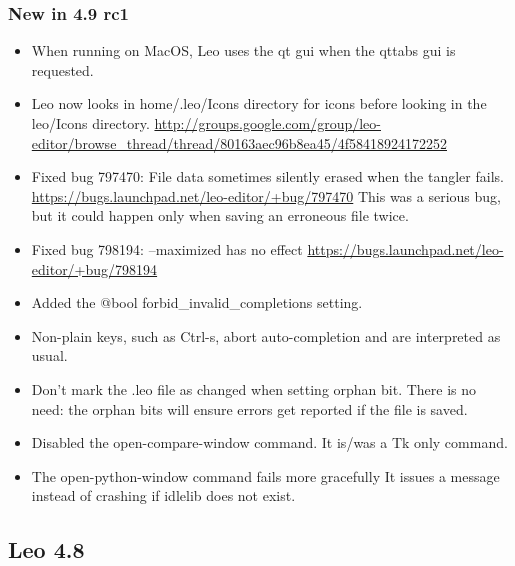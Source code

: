\documentclass[a4paper,10pt,english]{sphinxmanual}
\begin{document}
\subsubsection{New in 4.9 rc1}
\label{what-is-new:new-in-4-9-rc1}\begin{itemize}
\item {} 
When running on MacOS, Leo uses the qt gui when the qttabs gui is requested.

\item {} 
Leo now looks in home/.leo/Icons directory for icons before looking in the
leo/Icons directory.
\href{http://groups.google.com/group/leo-editor/browse\_thread/thread/80163aec96b8ea45/4f58418924172252}{http://groups.google.com/group/leo-editor/browse\_thread/thread/80163aec96b8ea45/4f58418924172252}

\item {} 
Fixed bug 797470: File data sometimes silently erased when the tangler fails.
\href{https://bugs.launchpad.net/leo-editor/+bug/797470}{https://bugs.launchpad.net/leo-editor/+bug/797470} This was a serious bug, but
it could happen only when saving an erroneous file twice.

\item {} 
Fixed bug 798194: --maximized has no effect
\href{https://bugs.launchpad.net/leo-editor/+bug/798194}{https://bugs.launchpad.net/leo-editor/+bug/798194}

\item {} 
Added the @bool forbid\_invalid\_completions setting.

\item {} 
Non-plain keys, such as Ctrl-s, abort auto-completion and are interpreted as
usual.

\item {} 
Don't mark the .leo file as changed when setting orphan bit. There is no need:
the orphan bits will ensure errors get reported if the file is saved.

\item {} 
Disabled the open-compare-window command. It is/was a Tk only command.

\item {} 
The open-python-window command fails more gracefully It issues a message
instead of crashing if idlelib does not exist.

\end{itemize}


\subsection{Leo 4.8}
\label{what-is-new:leo-4-8}
\end{document}
